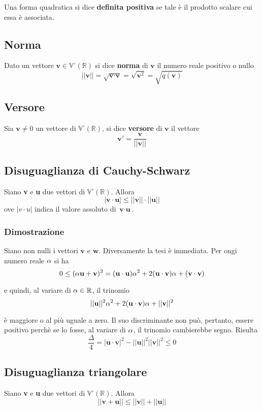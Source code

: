 \documentclass[../main.tex]{subfiles}
\begin{document}
Una forma quadratica si dice \textbf{definita positiva} se tale è il prodotto
scalare cui essa è associata.

\subsection{Norma}
Dato un vettore $\textbf{v}\in\mathbb{V}^{\circ}(\mathbb{R})$ si dice
\textbf{norma} di $\textbf{v}$ il numero reale positivo o nullo
\[
    ||\textbf{v}|| = \sqrt{\textbf{v}\cdot\textbf{v}} = \sqrt{\textbf{v}^2} = \sqrt{q(\textbf{v})}
\]

\subsection{Versore}
Sia $\textbf{v}\ne0$ un vettore di $\mathbb{V}^{\circ} (\mathbb{R})$, si dice
\textbf{versore} di $\textbf{v}$ il vettore
\[
    \textbf{v}' = \dfrac{\textbf{v}}{||\textbf{v}||}
\]

\subsection{Disuguaglianza di Cauchy-Schwarz}
Siano \textbf{v} e \textbf{u} due vettori di $\mathbb{V}^{\circ} (\mathbb{R})$.
Allora
\[
    |\textbf{v}\cdot\textbf{u}|\leq||\textbf{v}||\cdot||\textbf{u}||
\]
ove $|v\cdot u|$ indica il valore assoluto di $\textbf{v}\cdot\textbf{u}$.

\subsubsection{Dimostrazione}
Siano non nulli i vettori $\textbf{v}$ e $\textbf{w}$. Diversamente la tesi è
immediata. Per ongi numero reale $\alpha$ si ha
\[
    0\leq(\alpha\textbf{u}+\textbf{v})^2= (\textbf{u}\cdot\textbf{u})\alpha^2+2(\textbf{u}\cdot\textbf{v})\alpha+(\textbf{v}\cdot\textbf{v})\]

e quindi, al variare di $\alpha\in\mathbb{R}$, il trinomio
\[
    ||\textbf{u}||^2\alpha^2+2(\textbf{u}\cdot\textbf{v})\alpha+||\textbf{v}||^2
\]

è maggiore o al più uguale a zero. Il suo discriminante non può, pertanto, essere positivo perchè se lo fosse, al variare di $\alpha$, il trinomio cambierebbe segno. Risulta
\[
    \dfrac{\Delta}{4} = |\textbf{u}\cdot\textbf{v}|^2 - ||\textbf{u}||^2||\textbf{v}||^2\leq0\]

\subsection{Disuguaglianza triangolare}
Siano \textbf{v} e \textbf{u} due vettori di $\mathbb{V}^{\circ} (\mathbb{R})$.
Allora
\[
    ||\textbf{v}+\textbf{u}||\leq||\textbf{v}||+||\textbf{u}||
\]
\end{document}
